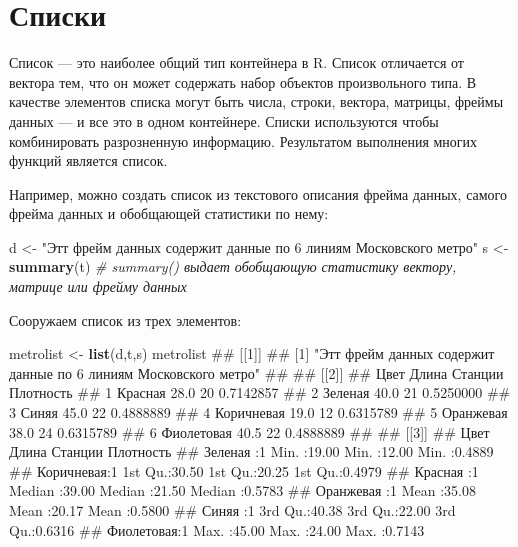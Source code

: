 \documentclass[]{book}
\newenvironment{Shaded}{\begin{snugshade}}{\end{snugshade}}
\newcommand{\KeywordTok}[1]{\textcolor[rgb]{0.13,0.29,0.53}{\textbf{#1}}}
\newcommand{\StringTok}[1]{\textcolor[rgb]{0.31,0.60,0.02}{#1}}
\newcommand{\CommentTok}[1]{\textcolor[rgb]{0.56,0.35,0.01}{\textit{#1}}}
\newcommand{\NormalTok}[1]{#1}
\begin{document}
\section{Списки}

Список --- это наиболее общий тип контейнера в R. Список отличается от
вектора тем, что он может содержать набор объектов произвольного типа. В
качестве элементов списка могут быть числа, строки, вектора, матрицы,
фреймы данных --- и все это в одном контейнере. Списки используются
чтобы комбинировать разрозненную информацию. Результатом выполнения
многих функций является список.

Например, можно создать список из текстового описания фрейма данных,
самого фрейма данных и обобщающей статистики по нему:

\begin{Shaded}
\begin{Highlighting}[]
\NormalTok{d <-}\StringTok{ "Этт фрейм данных содержит данные по 6 линиям Московского метро"}
\NormalTok{s <-}\StringTok{ }\KeywordTok{summary}\NormalTok{(t)  }\CommentTok{# summary() выдает обобщающую статистику вектору, матрице или фрейму данных}
\end{Highlighting}
\end{Shaded}

Сооружаем список из трех элементов:

\begin{Shaded}
\begin{Highlighting}[]
\NormalTok{metrolist <-}\StringTok{ }\KeywordTok{list}\NormalTok{(d,t,s)}
\NormalTok{metrolist}
\NormalTok{## [[1]]}
\NormalTok{## [1] "Этт фрейм данных содержит данные по 6 линиям Московского метро"}
\NormalTok{## }
\NormalTok{## [[2]]}
\NormalTok{##         Цвет Длина Станции Плотность}
\NormalTok{## 1    Красная  28.0      20 0.7142857}
\NormalTok{## 2    Зеленая  40.0      21 0.5250000}
\NormalTok{## 3      Синяя  45.0      22 0.4888889}
\NormalTok{## 4 Коричневая  19.0      12 0.6315789}
\NormalTok{## 5  Оранжевая  38.0      24 0.6315789}
\NormalTok{## 6 Фиолетовая  40.5      22 0.4888889}
\NormalTok{## }
\NormalTok{## [[3]]}
\NormalTok{##          Цвет       Длина          Станции        Плотность     }
\NormalTok{##  Зеленая   :1   Min.   :19.00   Min.   :12.00   Min.   :0.4889  }
\NormalTok{##  Коричневая:1   1st Qu.:30.50   1st Qu.:20.25   1st Qu.:0.4979  }
\NormalTok{##  Красная   :1   Median :39.00   Median :21.50   Median :0.5783  }
\NormalTok{##  Оранжевая :1   Mean   :35.08   Mean   :20.17   Mean   :0.5800  }
\NormalTok{##  Синяя     :1   3rd Qu.:40.38   3rd Qu.:22.00   3rd Qu.:0.6316  }
\NormalTok{##  Фиолетовая:1   Max.   :45.00   Max.   :24.00   Max.   :0.7143}
\end{Highlighting}
\end{Shaded}
\end{document}
